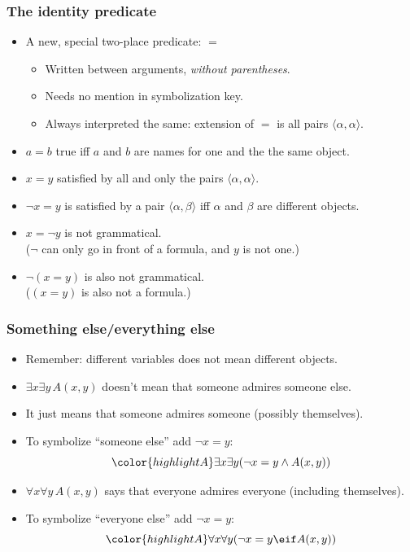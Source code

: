 \begin{frame}
  \frametitle{The identity predicate}

  \begin{itemize}[<+->]
    \item A new, special two-place predicate: \alert{$=$}
    \begin{itemize}[<+->]
      \item Written between arguments, \emph{without parentheses}.
      \item Needs no mention in symbolization key.
      \item Always interpreted the same: extension of $=$ is all pairs $\langle\alpha, \alpha\rangle$.
    \end{itemize}
    \item $a=b$ true iff $a$ and $b$ are names for one and the the same object.
    \item $x=y$ satisfied by all and only the pairs $\langle \alpha,\alpha\rangle$.
    \item $\lnot x=y$ is satisfied by a pair $\langle
    \alpha,\beta\rangle$ iff $\alpha$ and $\beta$ are different objects.
    \item \alert{$x = \lnot y$ is not grammatical.} \\
    ($\lnot$ can only go in front of a formula, and $y$ is not one.)
    \item \alert{$\lnot(x=y)$} is also not grammatical.\\
    ($(x=y)$ is also not a formula.)
  \end{itemize}
\end{frame}

\begin{frame}
    \frametitle{Something else/everything else}

\begin{itemize}[<+->]
\item Remember: different variables does not mean different objects.
\item $\exists x\exists y\,A(x,y)$ doesn't mean that someone admires
someone else.
\item It just means that someone admires someone (possibly
themselves).
\item To symbolize ``someone else'' add $\lnot x = y$:
\[\color{highlightA}
\exists x\exists y(\lnot x = y \land A(x,y))\]
\item $\forall x\forall y\,A(x,y)$ says that everyone admires everyone
(including themselves).
\item To symbolize ``everyone else'' add $\lnot x=y$:
\[\color{highlightA}
\forall x\forall y(\lnot x = y \eif A(x,y))\]
\end{itemize}
\end{frame}

